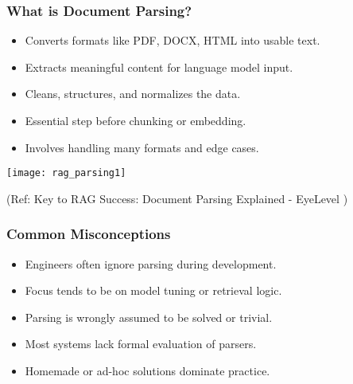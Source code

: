 \begin{frame}[fragile]\frametitle{What is Document Parsing?}

	  \begin{itemize}
		\item Converts formats like PDF, DOCX, HTML into usable text.
		\item Extracts meaningful content for language model input.
		\item Cleans, structures, and normalizes the data.
		\item Essential step before chunking or embedding.
		\item Involves handling many formats and edge cases.
	  \end{itemize}


		\begin{center}
		  \texttt{[image: rag\_parsing1]}
		  
		{\tiny (Ref: Key to RAG Success: Document Parsing Explained - EyeLevel )}
		  
		\end{center}
  
\end{frame}

\begin{frame}[fragile]\frametitle{Common Misconceptions}
  \begin{itemize}
    \item Engineers often ignore parsing during development.
    \item Focus tends to be on model tuning or retrieval logic.
    \item Parsing is wrongly assumed to be solved or trivial.
    \item Most systems lack formal evaluation of parsers.
    \item Homemade or ad-hoc solutions dominate practice.
  \end{itemize}
\end{frame}

